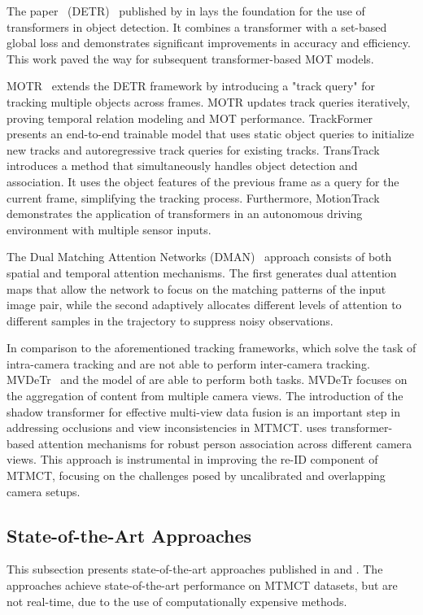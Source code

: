 The paper ~(DETR)~\cite{Carion20} published by \citeauthor{Carion20} in \citeyear{Carion20} lays the foundation for the use of transformers in object detection. It combines a transformer with a set-based global loss and demonstrates significant improvements in accuracy and efficiency. This work paved the way for subsequent transformer-based MOT models.

MOTR~\cite{Zeng21} extends the DETR framework by introducing a "track query" for tracking multiple objects across frames. MOTR updates track queries iteratively, proving temporal relation modeling and MOT performance. TrackFormer~\cite{Meinhardt22} presents an end-to-end trainable model that uses static object queries to initialize new tracks and autoregressive track queries for existing tracks. TransTrack~\cite{Sun20} introduces a method that simultaneously handles object detection and association. It uses the object features of the previous frame as a query for the current frame, simplifying the tracking process. Furthermore, MotionTrack~\cite{Zhang23} demonstrates the application of transformers in an autonomous driving environment with multiple sensor inputs.

The Dual Matching Attention Networks (DMAN)~\cite{Zhu19} approach consists of both spatial and temporal attention mechanisms. The first generates dual attention maps that allow the network to focus on the matching patterns of the input image pair, while the second adaptively allocates different levels of attention to different samples in the trajectory to suppress noisy observations.

In comparison to the aforementioned tracking frameworks, which solve the task of intra-camera tracking and are not able to perform inter-camera tracking. MVDeTr~\cite{Hou21} and the model of \textcite{Li21} are able to perform both tasks. MVDeTr focuses on the aggregation of content from multiple camera views. The introduction of the shadow transformer for effective multi-view data fusion is an important step in addressing occlusions and view inconsistencies in MTMCT. \cite{Li21} uses transformer-based attention mechanisms for robust person association across different camera views. This approach is instrumental in improving the re-ID component of MTMCT, focusing on the challenges posed by uncalibrated and overlapping camera setups.

\subsection{State-of-the-Art Approaches}\label{subsec:state-of-the-art_approaches}
This subsection presents state-of-the-art approaches published in \citeyear{Hsu22} and \citeyear{Teepe23}. The approaches achieve state-of-the-art performance on MTMCT datasets, but are not real-time, due to the use of computationally expensive methods.

